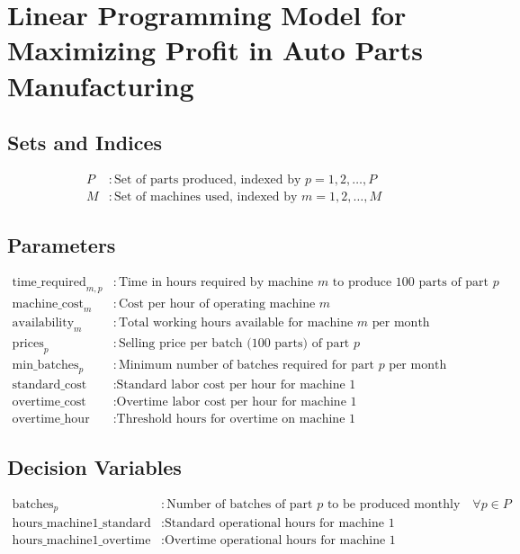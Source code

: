 \documentclass{article}
\begin{document}
\section*{Linear Programming Model for Maximizing Profit in Auto Parts Manufacturing}

\subsection*{Sets and Indices}
\begin{align*}
P & : \text{Set of parts produced, indexed by } p = 1, 2, \ldots, P \\
M & : \text{Set of machines used, indexed by } m = 1, 2, \ldots, M
\end{align*}

\subsection*{Parameters}
\begin{align*}
\text{time\_required}_{m,p} & : \text{Time in hours required by machine } m \text{ to produce 100 parts of part } p \\
\text{machine\_cost}_{m} & : \text{Cost per hour of operating machine } m \\
\text{availability}_{m} & : \text{Total working hours available for machine } m \text{ per month} \\
\text{prices}_{p} & : \text{Selling price per batch (100 parts) of part } p \\
\text{min\_batches}_{p} & : \text{Minimum number of batches required for part } p \text{ per month} \\
\text{standard\_cost} & : \text{Standard labor cost per hour for machine 1} \\
\text{overtime\_cost} & : \text{Overtime labor cost per hour for machine 1} \\
\text{overtime\_hour} & : \text{Threshold hours for overtime on machine 1}
\end{align*}

\subsection*{Decision Variables}
\begin{align*}
\text{batches}_{p} & : \text{Number of batches of part } p \text{ to be produced monthly} \quad \forall p \in P \\
\text{hours\_machine1\_standard} & : \text{Standard operational hours for machine 1} \\
\text{hours\_machine1\_overtime} & : \text{Overtime operational hours for machine 1}
\end{align*}
\end{document}

